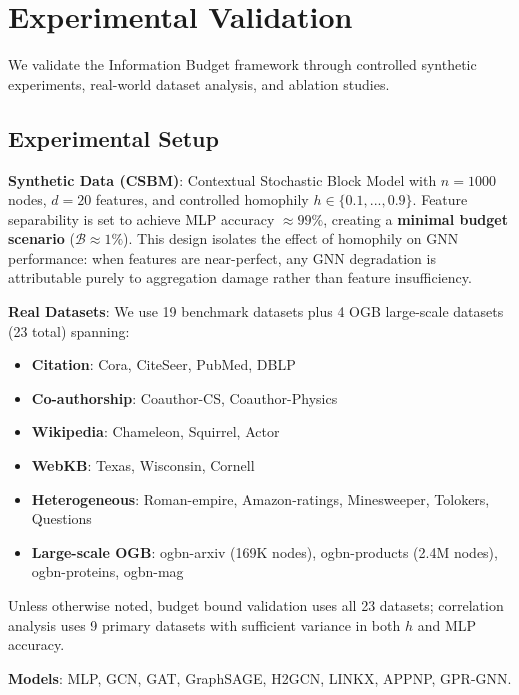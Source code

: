 
\section{Experimental Validation}
\label{sec:experiments}

We validate the Information Budget framework through controlled synthetic experiments, real-world dataset analysis, and ablation studies.

\subsection{Experimental Setup}

\textbf{Synthetic Data (CSBM)}: Contextual Stochastic Block Model with $n=1000$ nodes, $d=20$ features, and controlled homophily $h \in \{0.1, ..., 0.9\}$. Feature separability is set to achieve MLP accuracy $\approx 99\%$, creating a \textbf{minimal budget scenario} ($\mathcal{B} \approx 1\%$). This design isolates the effect of homophily on GNN performance: when features are near-perfect, any GNN degradation is attributable purely to aggregation damage rather than feature insufficiency.

\textbf{Real Datasets}: We use 19 benchmark datasets plus 4 OGB large-scale datasets (23 total) spanning:
\begin{itemize}
    \item \textbf{Citation}: Cora, CiteSeer, PubMed, DBLP
    \item \textbf{Co-authorship}: Coauthor-CS, Coauthor-Physics
    \item \textbf{Wikipedia}: Chameleon, Squirrel, Actor
    \item \textbf{WebKB}: Texas, Wisconsin, Cornell
    \item \textbf{Heterogeneous}: Roman-empire, Amazon-ratings, Minesweeper, Tolokers, Questions
    \item \textbf{Large-scale OGB}: ogbn-arxiv (169K nodes), ogbn-products (2.4M nodes), ogbn-proteins, ogbn-mag
\end{itemize}
Unless otherwise noted, budget bound validation uses all 23 datasets; correlation analysis uses 9 primary datasets with sufficient variance in both $h$ and MLP accuracy.

\textbf{Models}: MLP, GCN, GAT, GraphSAGE, H2GCN, LINKX, APPNP, GPR-GNN.

